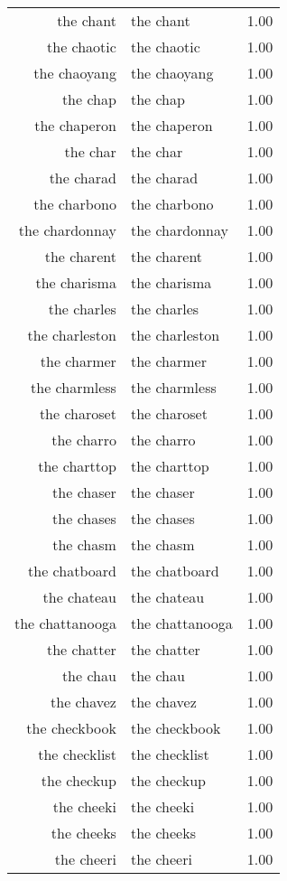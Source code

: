 \begin{table}[ht]
\begin{tabular}{rlr}
  the chant & the chant & 1.00 \\ 
  the chaotic & the chaotic & 1.00 \\ 
  the chaoyang & the chaoyang & 1.00 \\ 
  the chap & the chap & 1.00 \\ 
  the chaperon & the chaperon & 1.00 \\ 
  the char & the char & 1.00 \\ 
  the charad & the charad & 1.00 \\ 
  the charbono & the charbono & 1.00 \\ 
  the chardonnay & the chardonnay & 1.00 \\ 
  the charent & the charent & 1.00 \\ 
  the charisma & the charisma & 1.00 \\ 
  the charles & the charles & 1.00 \\ 
  the charleston & the charleston & 1.00 \\ 
  the charmer & the charmer & 1.00 \\ 
  the charmless & the charmless & 1.00 \\ 
  the charoset & the charoset & 1.00 \\ 
  the charro & the charro & 1.00 \\ 
  the charttop & the charttop & 1.00 \\ 
  the chaser & the chaser & 1.00 \\ 
  the chases & the chases & 1.00 \\ 
  the chasm & the chasm & 1.00 \\ 
  the chatboard & the chatboard & 1.00 \\ 
  the chateau & the chateau & 1.00 \\ 
  the chattanooga & the chattanooga & 1.00 \\ 
  the chatter & the chatter & 1.00 \\ 
  the chau & the chau & 1.00 \\ 
  the chavez & the chavez & 1.00 \\ 
  the checkbook & the checkbook & 1.00 \\ 
  the checklist & the checklist & 1.00 \\ 
  the checkup & the checkup & 1.00 \\ 
  the cheeki & the cheeki & 1.00 \\ 
  the cheeks & the cheeks & 1.00 \\ 
  the cheeri & the cheeri & 1.00 \\ 

\end{tabular}
\end{table}
